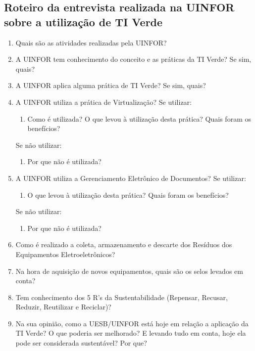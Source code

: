 \begin{apendicesenv}
\chapter{Roteiro da entrevista realizada na UINFOR sobre a utilização de TI Verde}

\begin{enumerate}
    \item Quais são as atividades realizadas pela UINFOR?
    \item A UINFOR tem conhecimento do conceito e as práticas da TI Verde? Se sim, quais?
    \item A UINFOR aplica alguma prática de TI Verde? Se sim, quais?
    \item A UINFOR utiliza a prática de Virtualização?
    \subitem Se utilizar:
    \begin{enumerate}
        \item Como é utilizada? O que levou à utilização desta prática? Quais foram os benefícios?
    \end{enumerate}
    \subitem Se não utilizar:
    \begin{enumerate}
        \item Por que não é utilizada?
    \end{enumerate}
    \item A UINFOR utiliza a Gerenciamento Eletrônico de Documentos?
    \subitem Se utilizar:
    \begin{enumerate}
        \item O que levou à utilização desta prática? Quais foram os benefícios?
    \end{enumerate}
    \subitem Se não utilizar:
    \begin{enumerate}
        \item Por que não é utilizada?
    \end{enumerate}
    \item Como é realizado a coleta, armazenamento e descarte dos Resíduos dos Equipamentos Eletroeletrônicos?
    \item Na hora de aquisição de novos equipamentos, quais são os selos levados em conta?
    \item Tem conhecimento dos 5 R’s da Sustentabilidade (Repensar, Recusar, Reduzir, Reutilizar e Reciclar)?
    \item Na sua opinião, como a UESB/UINFOR está hoje em relação a aplicação da TI Verde? O que poderia ser melhorado? E levando tudo em conta, hoje ela pode ser considerada sustentável? Por que?
\end{enumerate}


\end{apendicesenv}
